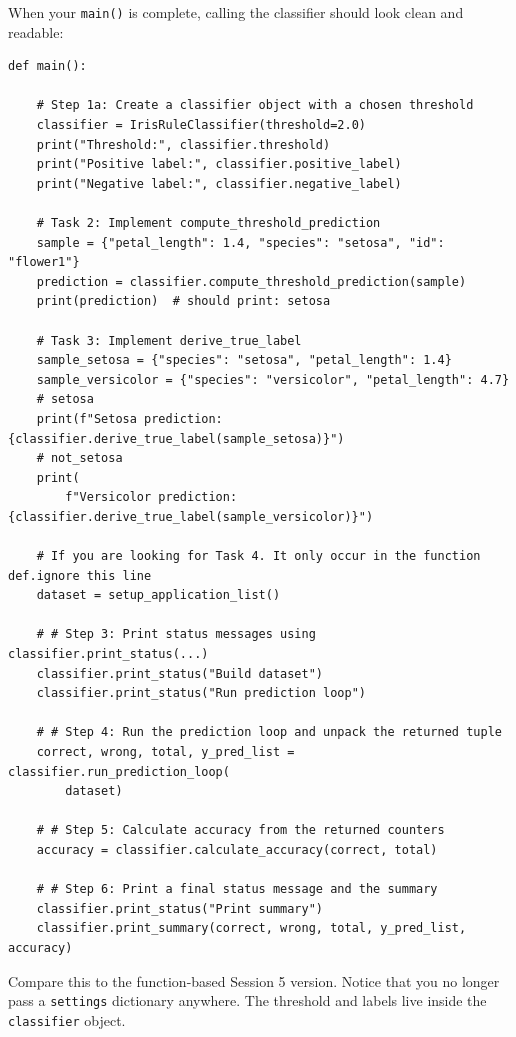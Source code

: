 When your \texttt{main()} is complete, calling the classifier should look clean and readable:

\begin{verbatim}
def main():

    # Step 1a: Create a classifier object with a chosen threshold
    classifier = IrisRuleClassifier(threshold=2.0)
    print("Threshold:", classifier.threshold)
    print("Positive label:", classifier.positive_label)
    print("Negative label:", classifier.negative_label)

    # Task 2: Implement compute_threshold_prediction
    sample = {"petal_length": 1.4, "species": "setosa", "id": "flower1"}
    prediction = classifier.compute_threshold_prediction(sample)
    print(prediction)  # should print: setosa

    # Task 3: Implement derive_true_label
    sample_setosa = {"species": "setosa", "petal_length": 1.4}
    sample_versicolor = {"species": "versicolor", "petal_length": 4.7}
    # setosa
    print(f"Setosa prediction: {classifier.derive_true_label(sample_setosa)}")
    # not_setosa
    print(
        f"Versicolor prediction: {classifier.derive_true_label(sample_versicolor)}")

    # If you are looking for Task 4. It only occur in the function def.ignore this line
    dataset = setup_application_list()

    # # Step 3: Print status messages using classifier.print_status(...)
    classifier.print_status("Build dataset")
    classifier.print_status("Run prediction loop")

    # # Step 4: Run the prediction loop and unpack the returned tuple
    correct, wrong, total, y_pred_list = classifier.run_prediction_loop(
        dataset)

    # # Step 5: Calculate accuracy from the returned counters
    accuracy = classifier.calculate_accuracy(correct, total)

    # # Step 6: Print a final status message and the summary
    classifier.print_status("Print summary")
    classifier.print_summary(correct, wrong, total, y_pred_list, accuracy)

\end{verbatim}

\noindent
Compare this to the function-based Session 5 version.
Notice that you no longer pass a \texttt{settings} dictionary anywhere.
The threshold and labels live inside the \texttt{classifier} object.

